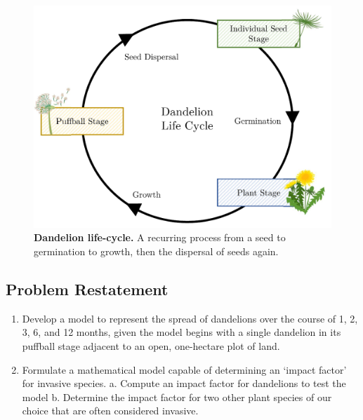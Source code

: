 \begin{figure}[h!]
\centering
    \includegraphics[scale=0.5]{figures/dandelionlifecycle.pdf}
    \captionsetup{width=0.9\textwidth}
    \caption{\textbf{Dandelion life-cycle.} A recurring process from a seed to germination to growth, then the dispersal of seeds again.}
    \label{fig:dandelionlifecycle}
\end{figure}

\subsection{Problem Restatement}

 \begin{enumerate}
 \item Develop a model to represent the spread of dandelions over the course of 1, 2, 3, 
6, and 12 months, given the model begins with a single dandelion in its puffball stage adjacent to an open, one-hectare plot of land.
\item Formulate a mathematical model capable of determining an ‘impact factor’ for invasive species.
\subitem a. Compute an impact factor for dandelions to test the model
\subitem b. Determine the impact factor for two other plant species of 
our choice that are often considered invasive.

\end{enumerate}
